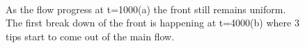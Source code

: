 \documentclass[preprint,authoryear,12pt]{elsarticle}
\begin{document}
\begin{figure}
\centering
{}\\[2mm]%
%
\caption{As the flow progress at t=1000(a) the front still remains uniform. The first break down of the front is happening at t=4000(b) where $3$ tips start to come out of the main flow.}
\label{fig:2b_homoheleshaw_10}
\end{figure}
\end{document}
